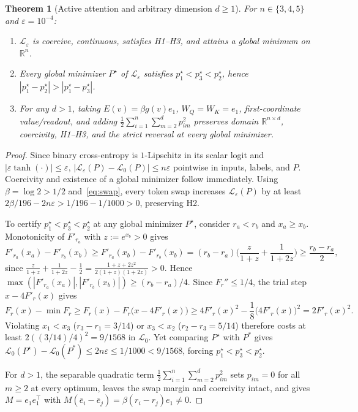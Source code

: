 \documentclass[11pt]{article}
\theoremstyle{plain}
\newtheorem{theorem}{Theorem}
\theoremstyle{definition}
\theoremstyle{remark}
\begin{document}
\begin{theorem}[Active attention and arbitrary dimension $d \ge 1$]\label{thm:active}
For $n \in \{3, 4, 5\}$ and $\varepsilon = 10^{-4}$:
\begin{enumerate}[label=\textup{(\arabic*)},leftmargin=2em,itemsep=2pt]
\item $\mathcal{L}_\varepsilon$ is coercive, continuous, satisfies \textup{H1--H3}, and attains a global minimum on $\mathbb{R}^n$.
\item Every global minimizer $P^\star$ of $\mathcal{L}_\varepsilon$ satisfies $p_1^\star < p_3^\star < p_2^\star$, hence $|p_1^\star - p_2^\star| > |p_1^\star - p_3^\star|$.
\item For any $d > 1$, taking $E(v) = \beta g(v) e_1$, $W_Q = W_K = e_1$, first-coordinate value/readout, and adding $\frac{1}{2}\sum_{i=1}^n \sum_{m=2}^d p_{im}^2$ preserves domain $\mathbb{R}^{n \times d}$, coercivity, \textup{H1--H3}, and the strict reversal at every global minimizer.
\end{enumerate}
\end{theorem}

\begin{proof}
Since binary cross-entropy is $1$-Lipschitz in its scalar logit and $|\varepsilon \tanh(\cdot)| \le \varepsilon$, $|\mathcal{L}_\varepsilon(P) - \mathcal{L}_0(P)| \le n\varepsilon$ pointwise in inputs, labels, and $P$. Coercivity and existence of a global minimizer follow immediately. Using $\beta = \log 2 > 1/2$ and~\eqref{eq:swap}, every token swap increases $\mathcal{L}_\varepsilon(P)$ by at least $2\beta/196 - 2n\varepsilon > 1/196 - 1/1000 > 0$, preserving H2.

To certify $p_1^\star < p_3^\star < p_2^\star$ at any global minimizer $P^\star$, consider $r_a < r_b$ and $x_a \ge x_b$. Monotonicity of $F'_{r_a}$ with $z := e^{x_b} > 0$ gives
\[
F'_{r_a}(x_a) - F'_{r_b}(x_b)
\ge F'_{r_a}(x_b) - F'_{r_b}(x_b)
= (r_b - r_a)\biggl(\frac{z}{1 + z} + \frac{1}{1 + 2z}\biggr)
\ge \frac{r_b - r_a}{2},
\]
since $\frac{z}{1+z} + \frac{1}{1+2z} - \frac{1}{2} = \frac{1 + z + 2z^2}{2(1+z)(1+2z)} > 0$. Hence $\max(|F'_{r_a}(x_a)|, |F'_{r_b}(x_b)|) \ge (r_b - r_a)/4$. Since $F_r'' \le 1/4$, the trial step $x - 4F'_r(x)$ gives
\[
F_r(x) - \min F_r \ge F_r(x) - F_r\bigl(x - 4F'_r(x)\bigr) \ge 4F'_r(x)^2 - \frac{1}{8}\bigl(4F'_r(x)\bigr)^2 = 2F'_r(x)^2.
\]
Violating $x_1 < x_3$ ($r_3 - r_1 = 3/14$) or $x_3 < x_2$ ($r_2 - r_3 = 5/14$) therefore costs at least $2((3/14)/4)^2 = 9/1568$ in $\mathcal{L}_0$. Yet comparing $P^\star$ with $P^*$ gives $\mathcal{L}_0(P^\star) - \mathcal{L}_0(P^*) \le 2n\varepsilon \le 1/1000 < 9/1568$, forcing $p_1^\star < p_3^\star < p_2^\star$.

For $d > 1$, the separable quadratic term $\frac{1}{2}\sum_{i=1}^n \sum_{m=2}^d p_{im}^2$ sets $p_{im} = 0$ for all $m \ge 2$ at every optimum, leaves the swap margin and coercivity intact, and gives $M = e_1 e_1^\top$ with $M(\bar{e}_i - \bar{e}_j) = \beta(r_i - r_j)e_1 \neq 0$.
\end{proof}
\end{document}
